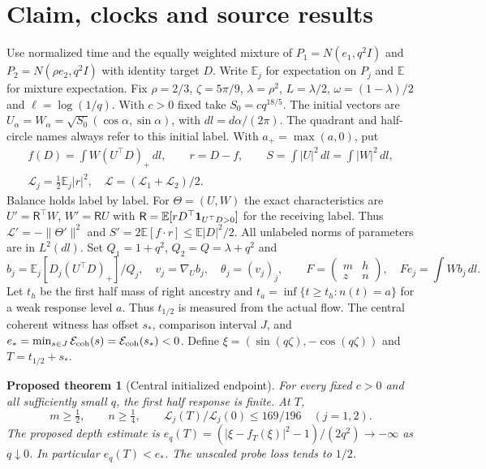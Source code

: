 \documentclass[11pt]{article}
\newtheorem{theorem}{Proposed theorem}
\newcommand{\dd}{\,dl}
\newcommand{\Ll}{\mathcal L}
\newcommand{\E}{\mathbb E}
\begin{document}
\section{Claim, clocks and source results}\label{an04ce5v1:setup}
Use normalized time and the equally weighted mixture of $P_1=N(e_1,q^2I)$ and $P_2=N(\rho e_2,q^2I)$ with identity target $D$. Write $\E_j$ for expectation on $P_j$ and $\E$ for mixture expectation.
Fix $\rho=2/3$, $\zeta=5\pi/9$, $\lambda=\rho^2$, $L=\lambda/2$, $\omega=(1-\lambda)/2$ and $\ell=\log(1/q)$. With $c>0$ fixed take $S_0=cq^{18/5}$. The initial vectors are $U_\alpha=W_\alpha=\sqrt{S_0}(\cos\alpha,\sin\alpha)$, with $dl=d\alpha/(2\pi)$. The quadrant and half-circle names always refer to this initial label. With $a_+=\max(a,0)$, put
\[
 \begin{gathered} f(D)=\int W(U^\top D)_+\dd,\qquad r=D-f,\qquad
 S=\int |U|^2\dd=\int |W|^2\dd,\\
 \Ll_j=\tfrac12\E_j|r|^2,\quad \Ll=(\Ll_1+\Ll_2)/2.\end{gathered}
\]
Balance holds label by label. For $\Theta=(U,W)$ the exact characteristics are
$U'=\mathsf R^\top W$, $W'=\mathsf R U$ with
$\mathsf R=\E[rD^\top{\bf1}_{U^\top D>0}]$ for the receiving label.
Thus $\Ll'=-\|\Theta'\|^2$ and $S'=2\E[f\cdot r]\le \E|D|^2/2$.
All unlabeled norms of parameters are in $L^2(dl)$. Set $Q_1=1+q^2$, $Q_2=Q=\lambda+q^2$ and
\[
 b_j=\E_j[D_j(U^\top D)_+]/Q_j,\quad v_j=\nabla_U b_j,\quad
 \theta_j=(v_j)_j,\qquad
 F=\begin{pmatrix}m&h\\z&n\end{pmatrix},\quad Fe_j=\int W b_j\dd.
\]
Let $t_h$ be the first half mass of right ancestry and $t_a=\inf\{t\ge t_h:n(t)=a\}$ for a weak response level $a$. Thus $t_{1/2}$ is measured from the actual flow. The central coherent witness has offset $s_*$, comparison interval $J$, and $e_*=\min_{s\in J}\mathcal E_{\rm coh}(s)=\mathcal E_{\rm coh}(s_*)<0$. Define $\xi=(\sin(q\zeta),-\cos(q\zeta))$ and $T=t_{1/2}+s_*$.
\begin{theorem}[Central initialized endpoint]\label{an04ce5v1:main}
For every fixed $c>0$ and all sufficiently small $q$, the first half response is finite. At $T$,
\[
 m\ge\tfrac12,\qquad n\ge\tfrac14,\qquad
 \Ll_j(T)/\Ll_j(0)\le169/196\quad(j=1,2).
\]
The proposed depth estimate is
$e_q(T)=(|\xi-f_T(\xi)|^2-1)/(2q^2)\to-\infty$ as $q\downarrow0$.
In particular $e_q(T)<e_*$. The unscaled probe loss tends to $1/2$.
\end{theorem}
\end{document}
